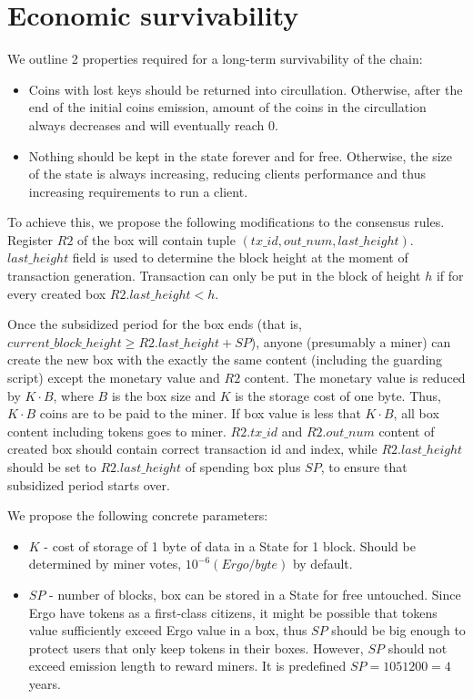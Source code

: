\section{Economic survivability}

We outline 2 properties required for a long-term survivability of the chain:

\begin{itemize}
    \item{} Coins with lost keys should be returned into circullation.
    Otherwise, after the end of the initial coins emission, amount of the coins
    in the circullation always decreases and will eventually reach 0.
    \item{} Nothing should be kept in the state forever and for free.
    Otherwise, the size of the state is always increasing, reducing clients performance
    and thus increasing requirements to run a client.
\end{itemize}

To achieve this, we propose the following modifications to the consensus rules.
Register $R2$ of the box will contain tuple $(tx\_id, out\_num,
last\_height)$. $last\_height$ field is used to determine the block height
at the moment of transaction generation. Transaction can only be put in the
block of height $h$ if for every created box $R2.last\_height < h$.

Once the subsidized period for the box ends (that is,
$current\_block\_height \ge R2.last\_height + SP$), anyone (presumably a miner) can
create the new box with the exactly the same content (including the guarding
script) except the monetary value and $R2$ content. The monetary value is
reduced by $K \cdot B$, where $B$ is the box size and $K$ is the storage cost of one byte.
Thus, $K \cdot B$ coins are to be paid to the miner.
If box value is less that $K \cdot B$, all box content including tokens goes to miner.
$R2.tx\_id$ and $R2.out\_num$ content of created box should contain correct transaction id
and index, while $R2.last\_height$ should be set to $R2.last\_height$ of spending box
plus $SP$, to ensure that subsidized period starts over.

We propose the following concrete parameters:
\begin{itemize}
    \item{} $K$ - cost of storage of 1 byte of data in a State for 1 block.
    Should be determined by miner votes, $10^{-6} (Ergo/byte)$ by default.
    \item{} $SP$ - number of blocks, box can be stored in a State for free untouched.
    Since Ergo have tokens as a first-class citizens, it might be possible that tokens value
    sufficiently exceed Ergo value in a box, thus $SP$ should be big enough to protect users
    that only keep tokens in their boxes.
    However, $SP$ should not exceed emission length to reward miners.
    It is predefined $SP = 1051200 = 4$ years.
\end{itemize}